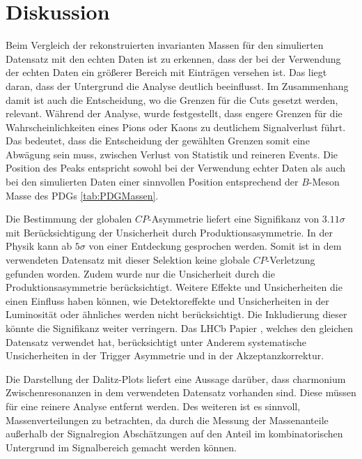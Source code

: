 \section{Diskussion}
\label{sec:discussion}

Beim Vergleich der rekonstruierten invarianten Massen für den simulierten Datensatz
mit den echten Daten ist zu erkennen, dass der bei der Verwendung der echten Daten
ein größerer Bereich mit Einträgen versehen ist. Das liegt daran, dass der Untergrund
die Analyse deutlich beeinflusst. Im Zusammenhang damit ist auch die Entscheidung, wo
die Grenzen für die Cuts gesetzt werden, relevant. Während der Analyse, wurde
festgestellt, dass engere Grenzen für die Wahrscheinlichkeiten eines Pions oder
Kaons zu deutlichem Signalverlust führt. Das bedeutet, dass die Entscheidung der
gewählten Grenzen somit eine Abwägung sein muss, zwischen Verlust von Statistik
und reineren Events. Die Position des Peaks entspricht sowohl bei der Verwendung
echter Daten als auch bei den simulierten Daten einer sinnvollen Position entsprechend
der $B$-Meson Masse des PDGs \ref{tab:PDGMassen}. \par

Die Bestimmung der globalen $CP$-Asymmetrie liefert eine Signifikanz von
$3.11\sigma$ mit Berücksichtigung der Unsicherheit durch
Produktionsasymmetrie. In der Physik kann ab $5\sigma$ von einer Entdeckung
gesprochen werden. Somit ist in dem verwendeten Datensatz mit dieser
Selektion keine globale $CP$-Verletzung gefunden worden. Zudem wurde nur die
Unsicherheit durch die Produktionsasymmetrie berücksichtigt. Weitere Effekte
und Unsicherheiten die einen Einfluss haben können, wie Detektoreffekte und
Unsicherheiten in der Luminosität oder ähnliches werden nicht berücksichtigt.
Die Inkludierung dieser könnte die Signifikanz weiter verringern. Das LHCb
Papier \cite{paper}, welches den gleichen Datensatz verwendet hat, berücksichtigt
unter Anderem systematische Unsicherheiten in der Trigger Asymmetrie und
in der Akzeptanzkorrektur. \par

Die Darstellung der Dalitz-Plots liefert eine Aussage darüber, dass charmonium
Zwischenresonanzen in dem verwendeten Datensatz vorhanden sind. Diese müssen
für eine reinere Analyse entfernt werden. Des weiteren ist es sinnvoll,
Massenverteilungen zu betrachten, da durch die Messung der Massenanteile
außerhalb der Signalregion Abschätzungen auf den Anteil im kombinatorischen
Untergrund im Signalbereich gemacht werden können.\par

